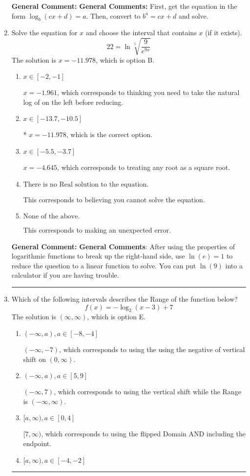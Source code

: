 \documentclass{extbook}[14pt]
\newcommand{\litem}[1]{\item #1

\rule{\textwidth}{0.4pt}}
\begin{document}
\begin{enumerate}
{\textbf{General Comment:} \textbf{General Comments:} First, get the equation in the form $\log_b{(cx+d)} = a$. Then, convert to $b^a = cx+d$ and solve.
}
\litem{
 Solve the equation for $x$ and choose the interval that contains $x$ (if it exists).
\[  22 = \ln{\sqrt[5]{\frac{9}{e^{9x}}}} \]The solution is \( x = -11.978 \), which is option B.\begin{enumerate}[label=\Alph*.]
\item \( x \in [-2, -1] \)

$x = -1.961$, which corresponds to thinking you need to take the natural log of on the left before reducing.
\item \( x \in [-13.7, -10.5] \)

* $x = -11.978$, which is the correct option.
\item \( x \in [-5.5, -3.7] \)

$x = -4.645$, which corresponds to treating any root as a square root.
\item \( \text{There is no Real solution to the equation.} \)

This corresponds to believing you cannot solve the equation.
\item \( \text{None of the above.} \)

This corresponds to making an unexpected error.
\end{enumerate}

\textbf{General Comment:} \textbf{General Comments}: After using the properties of logarithmic functions to break up the right-hand side, use $\ln(e) = 1$ to reduce the question to a linear function to solve. You can put $\ln(9)$ into a calculator if you are having trouble.
}
\litem{
Which of the following intervals describes the Range of the function below?
\[ f(x) = -\log_2{(x-3)}+7 \]The solution is \( (\infty, \infty) \), which is option E.\begin{enumerate}[label=\Alph*.]
\item \( (-\infty, a), a \in [-8, -4] \)

$(-\infty, -7)$, which corresponds to using the using the negative of vertical shift on $(0, \infty)$.
\item \( (-\infty, a), a \in [5, 9] \)

$(-\infty, 7)$, which corresponds to using the vertical shift while the Range is $(-\infty, \infty)$.
\item \( [a, \infty), a \in [0, 4] \)

$[7, \infty)$, which corresponds to using the flipped Domain AND including the endpoint.
\item \( [a, \infty), a \in [-4, -2] \)


\end{enumerate}}
\end{enumerate}
\end{document}
